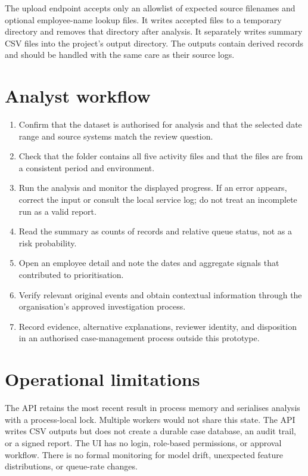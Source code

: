 \documentclass[12pt,a4paper,oneside]{report}
\begin{document}
The upload endpoint accepts only an allowlist of expected source
filenames and optional employee-name lookup files. It writes accepted
files to a temporary directory and removes that directory after
analysis. It separately writes summary CSV files into the project's
output directory. The outputs contain derived records and should be
handled with the same care as their source logs.

\section{Analyst workflow}
\begin{enumerate}
  \item Confirm that the dataset is authorised for analysis and that
  the selected date range and source systems match the review
  question.
  \item Check that the folder contains all five activity files and
  that the files are from a consistent period and environment.
  \item Run the analysis and monitor the displayed progress. If an
  error appears, correct the input or consult the local service log;
  do not treat an incomplete run as a valid report.
  \item Read the summary as counts of records and relative queue
  status, not as a risk probability.
  \item Open an employee detail and note the dates and aggregate
  signals that contributed to prioritisation.
  \item Verify relevant original events and obtain contextual
  information through the organisation's approved investigation
  process.
  \item Record evidence, alternative explanations, reviewer identity,
  and disposition in an authorised case-management process outside
  this prototype.
\end{enumerate}

\section{Operational limitations}
The API retains the most recent result in process memory and serialises
analysis with a process-local lock. Multiple workers would not share
this state. The API writes CSV outputs but does not create a durable
case database, an audit trail, or a signed report. The UI has no
login, role-based permissions, or approval workflow. There is no
formal monitoring for model drift, unexpected feature distributions,
or queue-rate changes.
\end{document}
